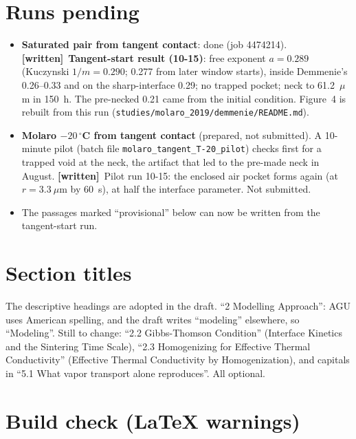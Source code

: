 \documentclass[11pt]{article}
\newcommand{\Have}{\textcolor{have}{\textbf{[written]}}\ }
\begin{document}
\section*{Runs pending}
\begin{itemize}
\item \textbf{Saturated pair from tangent contact}: done (job 4474214).
  \Have \textbf{Tangent-start result (10-15)}: free exponent $a = 0.289$
(Kuczynski $1/m = 0.290$; 0.277 from later window starts), inside Demmenie's
0.26--0.33 and on the sharp-interface 0.29; no trapped pocket; neck to
61.2~$\mu$m in 150~h. The pre-necked 0.21 came from the initial condition.
Figure~4 is rebuilt from this run (\texttt{studies/molaro\_2019/demmenie/README.md}).
\item \textbf{Molaro $-20\,^{\circ}$C from tangent contact} (prepared, not
  submitted). A 10-minute pilot (batch file
  \texttt{molaro\_tangent\_T-20\_pilot}) checks first for a trapped void at
  the neck, the artifact that led to the pre-made neck in August.
  \Have Pilot run 10-15: the enclosed air pocket forms again (at
  $r = 3.3~\mu$m by 60~s), at half the interface parameter. Not submitted.
\item The passages marked ``provisional'' below can now be written from the
  tangent-start run.
\end{itemize}

\section*{Section titles}
The descriptive headings are adopted in the draft. ``2 Modelling
Approach'': AGU uses American spelling, and the draft writes ``modeling''
elsewhere, so ``Modeling''. Still to change: ``2.2 Gibbs-Thomson Condition''
(Interface Kinetics and the Sintering Time Scale), ``2.3 Homogenizing for
Effective Thermal Conductivity'' (Effective Thermal Conductivity by
Homogenization), and capitals in ``5.1 What vapor transport alone
reproduces''. All optional.

\section*{Build check (LaTeX warnings)}
\end{document}
